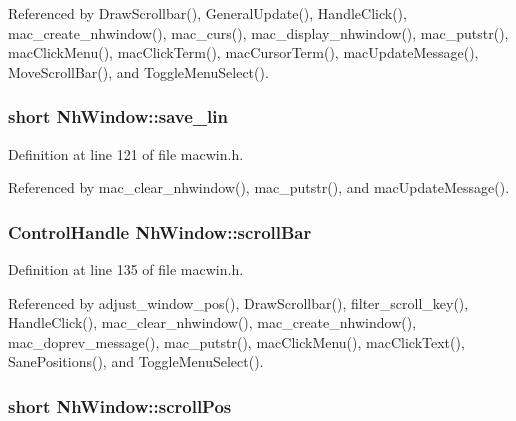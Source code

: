 Referenced by Draw\+Scrollbar(), General\+Update(), Handle\+Click(), mac\+\_\+create\+\_\+nhwindow(), mac\+\_\+curs(), mac\+\_\+display\+\_\+nhwindow(), mac\+\_\+putstr(), mac\+Click\+Menu(), mac\+Click\+Term(), mac\+Cursor\+Term(), mac\+Update\+Message(), Move\+Scroll\+Bar(), and Toggle\+Menu\+Select().

\hypertarget{structNhWindow_a5df57289ac1b5436228829358f8f9f38}{
\subsubsection[{save\+\_\+lin}]{\setlength{\rightskip}{0pt plus 5cm}short Nh\+Window\+::save\+\_\+lin}}\label{structNhWindow_a5df57289ac1b5436228829358f8f9f38}


Definition at line 121 of file macwin.\+h.



Referenced by mac\+\_\+clear\+\_\+nhwindow(), mac\+\_\+putstr(), and mac\+Update\+Message().

\hypertarget{structNhWindow_a37c4c6314ea6315bb4e99c33d432d491}{
\subsubsection[{scroll\+Bar}]{\setlength{\rightskip}{0pt plus 5cm}Control\+Handle Nh\+Window\+::scroll\+Bar}}\label{structNhWindow_a37c4c6314ea6315bb4e99c33d432d491}


Definition at line 135 of file macwin.\+h.



Referenced by adjust\+\_\+window\+\_\+pos(), Draw\+Scrollbar(), filter\+\_\+scroll\+\_\+key(), Handle\+Click(), mac\+\_\+clear\+\_\+nhwindow(), mac\+\_\+create\+\_\+nhwindow(), mac\+\_\+doprev\+\_\+message(), mac\+\_\+putstr(), mac\+Click\+Menu(), mac\+Click\+Text(), Sane\+Positions(), and Toggle\+Menu\+Select().

\hypertarget{structNhWindow_a4c65211aa8af5e5dd5049aaf7c4b7ef3}{
\subsubsection[{scroll\+Pos}]{\setlength{\rightskip}{0pt plus 5cm}short Nh\+Window\+::scroll\+Pos}}\label{structNhWindow_a4c65211aa8af5e5dd5049aaf7c4b7ef3}


